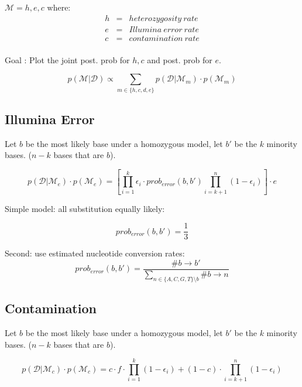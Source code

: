 \documentclass[a4paper,12pt]{article}
\begin{document}
$\mathcal{M} = {h,e,c}$
where:
\begin{eqnarray*}
h & = & heterozygosity\ rate \\
e & = & Illumina\ error\ rate \\
c & = & contamination\ rate \\
\end{eqnarray*}

Goal : Plot the joint post. prob for ${h,c}$ and post. prob for $e$.

\begin{equation}
p(\mathcal{M} | \mathcal{D}   ) \propto \sum_{m \in \{ h,c,d,e\} }  p(\mathcal{D}  | \mathcal{M}_{m} ) \cdot p(\mathcal{M}_{m} )
\end{equation}




\subsection{Illumina Error}

Let $b$ be the most likely base under a homozygous model, let $b'$ be the $k$ minority bases. ($n-k$ bases that are $b$). 

\begin{equation}
p(\mathcal{D}  | \mathcal{M}_{e} ) \cdot p(\mathcal{M}_{e} ) = [ \prod_{i=1}^k \epsilon_i \cdot prob_{error}(b,b') \prod_{i=k+1}^n ({1-\epsilon_i}) ] \cdot e
\end{equation}

\noindent Simple model: all substitution equally likely:

\begin{equation}
prob_{error}(b,b')   = \frac {1} {3}
\end{equation}

\noindent Second: use estimated nucleotide conversion rates:
\begin{equation}
prob_{error}(b,b')   = \frac {\# b \rightarrow b'} {\sum\limits_{n\in\{A,C,G,T\} \setminus b}{\# b \rightarrow n}}
\end{equation}




\subsection{Contamination}

Let $b$ be the most likely base under a homozygous model, let $b'$ be the $k$ minority bases. ($n-k$ bases that are $b$). 

\begin{equation}
p(\mathcal{D}  | \mathcal{M}_{c} ) \cdot p(\mathcal{M}_{c} ) = 
c \cdot f \cdot \prod_{i=1}^k (1-\epsilon_i)  + (1-c) \cdot \prod_{i=k+1}^n ({1-\epsilon_i}) 
\end{equation}
\end{document}
